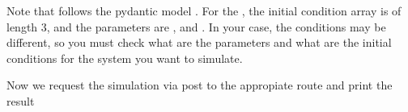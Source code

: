 \documentclass[a4paper,landscape,10pt,english]{sphinxmanual}
\begin{document}
\begin{sphinxVerbatim}[commandchars=\\\{\}]
     \PYG{p}{[}  \PYG{p}{]}
     
         
         
         
    
\end{sphinxVerbatim}

Note that  follows the pydantic model
. For the
, the initial
condition array is of length 3, and the parameters are
,
 and
. In your
case, the conditions may be different, so you must check what are the parameters
and what are the initial conditions for the system you want to simulate.

Now we request the simulation via post to the appropiate route and print the
result
\end{document}
